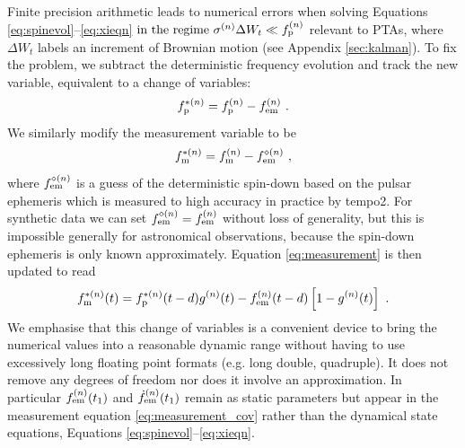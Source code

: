 \documentclass[fleqn,usenatbib,useAMS]{mnras}
\begin{document}
Finite precision arithmetic leads to numerical errors when solving Equations \eqref{eq:spinevol}--\eqref{eq:xieqn} $ \text{in  the regime } \sigma^{(n)} \Delta W_t \ll f_{\rm p}^{(n)}$ relevant to PTAs, where $\Delta W_t$ labels an increment of Brownian motion (see Appendix \ref{sec:kalman}). To fix the problem, we subtract the deterministic frequency evolution and track the new variable, equivalent to a change of variables:
\begin{equation}
	f_{\rm p}^{* (n)} = f_{\rm p}^{(n)} - f_{\rm em}^{(n)} \ .
\end{equation}  
We similarly modify the measurement variable to be
\begin{equation}
	f_{\rm m}^{* (n)} = f_{\rm m}^{(n)} - f_{\rm em}^{\diamond (n)} \ ,
\end{equation}
where $ f_{\rm em}^{\diamond (n)}$ is a guess of the deterministic spin-down based on the pulsar ephemeris which is measured to high accuracy in practice by {\sc tempo2}. For synthetic data we can set $ f_{\rm em}^{\diamond (n)} = f_{\rm em}^{(n)}$ without loss of generality, but this is impossible generally for astronomical observations, because the spin-down ephemeris is only known approximately. Equation \eqref{eq:measurement} is then updated to read 
\begin{equation}
	f_{\rm m}^{* (n)}(t) = f_{\rm p}^{* (n)}(t-d) g^{(n)}(t) -  f_{\rm em}^{(n)}(t-d)\left[ 1-g^{(n)}(t)\right] \ .
	\label{eq:measurement_cov}
\end{equation}
We emphasise that this change of variables is a convenient device to bring the numerical values into a reasonable dynamic range without having to use excessively long floating point formats (e.g. long double, quadruple). It does not remove any degrees of freedom nor does it involve an approximation. In particular $f_{\rm em}^{(n)}(t_1)$
and $\dot{f}_{\rm em}^{(n)}(t_1)$ remain as static parameters but appear in the measurement equation \eqref{eq:measurement_cov} rather than the dynamical state equations, Equations \ref{eq:spinevol}--\eqref{eq:xieqn}.
\end{document}
